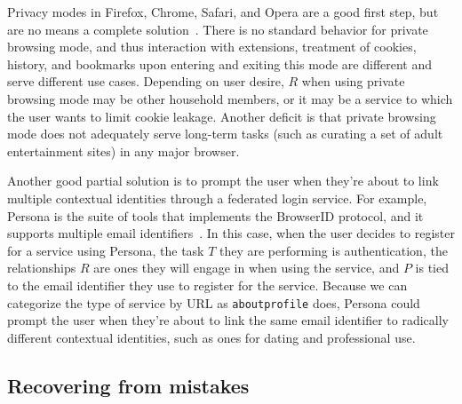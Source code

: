 \documentclass{llncs}
\begin{document}
Privacy modes in Firefox, Chrome, Safari, and Opera are a good first step, but
are no means a complete solution~\cite{ABBJ10}. There is no standard behavior
for private browsing mode, and thus interaction with extensions, treatment of
cookies, history, and bookmarks upon entering and exiting this mode are
different and serve different use cases. Depending on user desire, $R$ when
using private browsing mode may be other household members, or it may be a
service to which the user wants to limit cookie leakage. Another deficit is
that private browsing mode does not adequately serve long-term tasks (such as
curating a set of adult entertainment sites) in any major browser.

Another good partial solution is to prompt the user when they're about to link
multiple contextual identities through a federated login service. For example,
Persona is the suite of tools that implements the BrowserID protocol, and it
supports multiple email identifiers~\cite{browserid}. In this case, when the
user decides to register for a service using Persona, the task $T$ they are
performing is authentication, the relationships $R$ are ones they will engage
in when using the service, and $P$ is tied to the email identifier they use to
register for the service. Because we can categorize the type of service by URL
as \texttt{aboutprofile} does, Persona could prompt the user when they're about
to link the same email identifier to radically different contextual identities,
such as ones for dating and professional use.

\begin{comment}
TODO: Discuss how private browsing mode maps to R, T, P?

At home use case:
R is household
T is porn?
P is null

Searching use case:
R is Google
T is search
P is null

GoogleShring use case
R is Google and the GoogleSharing proxy
T is search or browsing (analytics) (can't use any services that require logon)
P is random
\end{comment}

\subsection{Recovering from mistakes}
\end{document}
